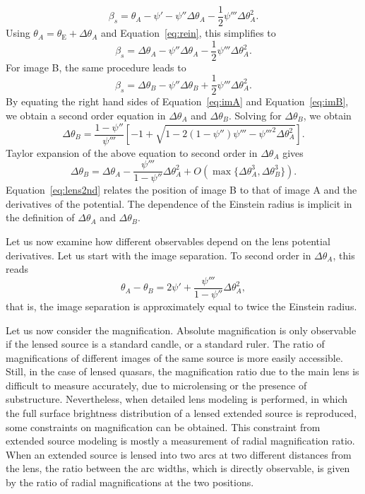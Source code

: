 \documentclass[usenatbib]{mnras}
\def\psii{\psi'}
\def\psiii{\psi''}
\def\psiiii{\psi'''}
\def\psiiiisq{\psi'''^{2}}
\def\tein{\theta_{\mathrm{E}}}
\def\Eref#1{Equation~\ref{#1}\xspace}
\begin{document}
\begin{equation}
\beta_s = \theta_A - \psii - \psiii \Delta\theta_A - \frac12 \psiiii \Delta\theta_A^2.
\end{equation}
Using $\theta_A = \tein + \Delta\theta_A$ and \Eref{eq:rein}, this simplifies to
\begin{equation}\label{eq:imA}
\beta_s = \Delta\theta_A - \psiii \Delta\theta_A - \frac12 \psiiii \Delta\theta_A^2.
\end{equation}
For image B, the same procedure leads to
\begin{equation}\label{eq:imB}
\beta_s = \Delta\theta_B - \psiii \Delta\theta_B + \frac12 \psiiii \Delta\theta_A^2.
\end{equation}
By equating the right hand sides of \Eref{eq:imA} and \Eref{eq:imB}, we obtain a second order equation in $\Delta\theta_A$ and $\Delta\theta_B$.
Solving for $\Delta\theta_B$, we obtain
\begin{equation}
\Delta\theta_B = \frac{1-\psiii}{\psiiii}\left[-1 + \sqrt{1 - 2(1-\psiii)\psiiii - \psiiiisq\Delta\theta_A^2}\right].
\end{equation}
Taylor expansion of the above equation to second order in $\Delta\theta_A$ gives
\begin{equation}\label{eq:lens2nd}
\Delta\theta_B = \Delta\theta_A - \frac{\psiiii}{1-\psiii}\Delta\theta_A^2 + O(\max{\{\Delta\theta_A^3, \Delta\theta_B^3\}}).
\end{equation}
%
\Eref{eq:lens2nd} relates the position of image B to that of image A and the derivatives of the potential.
The dependence of the Einstein radius is implicit in the definition of $\Delta\theta_A$ and $\Delta\theta_B$.

Let us now examine how different observables depend on the lens potential derivatives.
Let us start with the image separation. To second order in $\Delta\theta_A$, this reads
\begin{equation}\label{eq:imsep}
\theta_A - \theta_B = 2\psii + \frac{\psiiii}{1-\psiii}\Delta\theta_A^2,
\end{equation}
that is, the image separation is approximately equal to twice the Einstein radius.

Let us now consider the magnification. Absolute magnification is only observable if the lensed source is a standard candle, or a standard ruler.
The ratio of magnifications of different images of the same source is more easily accessible. Still, in the case of lensed quasars, the magnification ratio due to the main lens is difficult to measure accurately, due to microlensing or the presence of substructure.
Nevertheless, when detailed lens modeling is performed, in which the full surface brightness distribution of a lensed extended source is reproduced, some constraints on magnification can be obtained.
This constraint from extended source modeling is mostly a measurement of radial magnification ratio. 
When an extended source is lensed into two arcs at two different distances from the lens, the ratio between the arc widths, which is directly observable, is given by the ratio of radial magnifications at the two positions.
\end{document}
